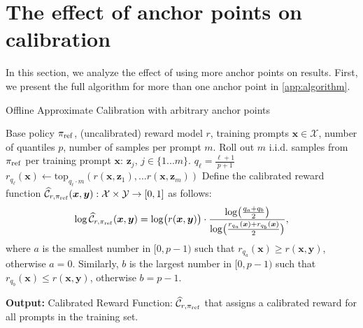 \documentclass{article}
\newcommand{\by}{{\bm{y}}}
\newcommand{\bx}{{\bm{x}}}
\newcommand{\bz}{{\bm{z}}}
\newcommand{\bp}{{\pi_{\rm ref}}} %
\newcommand{\car}{\mathcal{C}} %
\begin{document}
%
%
%
%
%
%
%
%
%
%
%
%
%
%


\clearpage
\section{The effect of anchor points on calibration}
\label{sec:more_anchors}
In this section, we analyze the effect of using more anchor points on results. First, we present the full algorithm for more than one anchor point in \cref{app:algorithm}.


\begin{algorithm}[ht]
\caption{Offline Approximate Calibration with arbitrary anchor points} \label{app:algorithm}
\begin{algorithmic}[1]
\Require Base policy $\bp$, (uncalibrated) reward model $r$, training prompts $\bx \in \mathcal{X}$, number of quantiles $p$, number of samples per prompt $m$. 
%
%
\ForAll{$\bx \in \mathcal{X}$}
\State Roll out $m$ i.i.d. samples from $\bp$ per training prompt $\bx$: $\bz_{j},\, j \in \{1...m\}$. %
%
\State $q_\ell = \frac{\ell+1}{p+1}$ 
\State $r_{q_\ell}(\bx) \leftarrow \text{top}_{ q_\ell \cdot m}(r(\bx, \bz_{1}), \ldots r(\bx, \bz_{m}))$ 
\EndFor
\EndFor
\State Define the calibrated reward function $\widehat{\car}_{r, \bp}(\bx, \by): \mathcal{X} \times \mathcal{Y} \to [0, 1]$ as follows:
\begin{align*}
{\log \widehat{\car}_{r, \bp}(\bx, \by)} = \log \bigl( r(\bx, \by) \bigr)  \cdot   \frac{  {\log \bigl( \frac{q_a + q_{b}}{2}}\bigr) }{\log \bigl( \frac{r_{q_a}(\bx) + r_{q_{b}}(\bx)}{2}\bigr) } ,
\end{align*}
where $a$ is the smallest number in $[0, p-1)$ such that $r_{q_a}(\bx) \geq r(\bx,\by)$, otherwise $a=0$. Similarly,  $b$ is the largest number in $[0, p-1)$ such that $r_{q_b}(\bx) \leq r(\bx,\by)$, otherwise $b=p-1$.

%
%
%
%
%
%
%
%
%
%
%

%
%
%
%
%
%
%
%
%
%
 \State \textbf{Output:} Calibrated Reward Function: $\widehat{\car}_{r, \bp}$ that assigns a calibrated reward for all prompts in the training set.
\end{algorithmic}
\end{algorithm}
\end{document}
